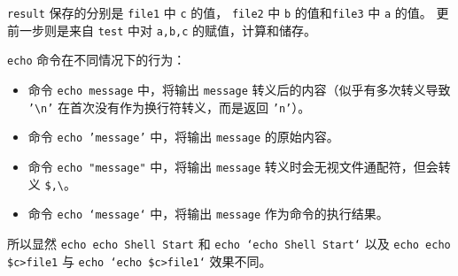 \texttt{result} 保存的分别是 \texttt{file1} 中 \texttt{c} 的值，
\texttt{file2} 中 \texttt{b} 的值和\texttt{file3} 中 \texttt{a} 的值。
更前一步则是来自 \texttt{test} 中对 \texttt{a,b,c} 的赋值，计算和储存。

\texttt{echo} 命令在不同情况下的行为：

\begin{itemize}
	\item 命令 \texttt{echo message} 中，将输出 \texttt{message} 转义后的内容（似乎有多次转义导致 \texttt{'\textbackslash n'} 在首次没有作为换行符转义，而是返回 \texttt{'n'}）。
	\item 命令 \texttt{echo 'message'} 中，将输出 \texttt{message} 的原始内容。
	\item 命令 \texttt{echo "message"} 中，将输出 \texttt{message} 转义时会无视文件通配符，但会转义 \texttt{\$,\textbackslash}。
	\item 命令 \texttt{echo `message`} 中，将输出 \texttt{message} 作为命令的执行结果。
\end{itemize}

所以显然 \texttt{echo echo Shell Start} 和 \texttt{echo `echo Shell Start`}
以及 \texttt{echo echo \$c>file1} 与 \texttt{echo `echo \$c>file1`} 效果不同。